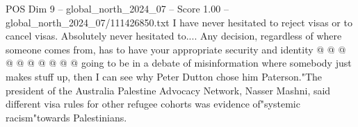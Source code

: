 \begin{textsample}{POS Dim 9 – global\_north\_2024\_07 – Score 1.00 – global\_north\_2024\_07/111426850.txt}
I have never hesitated to reject visas or to cancel visas.
Absolutely never hesitated to....
Any decision, regardless of where someone comes from, has to have your appropriate security and identity @ @ @ @ @ @ @ @ @ @ going to be in a debate of misinformation where somebody just makes stuff up, then I can see why Peter Dutton chose him Paterson."The president of the Australia Palestine Advocacy Network, Nasser Mashni, said different visa rules for other refugee cohorts was evidence of"systemic racism"towards Palestinians.

\end{textsample}
